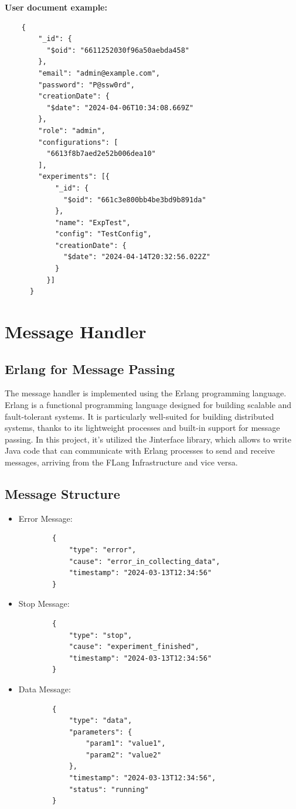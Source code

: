 \textbf{User document example:} \begin{verbatim}
    {
        "_id": {
          "$oid": "6611252030f96a50aebda458"
        },
        "email": "admin@example.com",
        "password": "P@ssw0rd",
        "creationDate": {
          "$date": "2024-04-06T10:34:08.669Z"
        },
        "role": "admin",
        "configurations": [
          "6613f8b7aed2e52b006dea10"
        ],
        "experiments": [{
            "_id": {
              "$oid": "661c3e800bb4be3bd9b891da"
            },
            "name": "ExpTest",
            "config": "TestConfig",
            "creationDate": {
              "$date": "2024-04-14T20:32:56.022Z"
            }
          }]
      }

    \end{verbatim}
\newpage
\section{Message Handler}

\subsection{Erlang for Message Passing}
The message handler is implemented using the Erlang programming language. Erlang is a functional programming language designed for building scalable and fault-tolerant systems. It is particularly well-suited for building distributed systems, thanks to its lightweight processes and built-in support for message passing. In this project, it's utilized the Jinterface library, which allows to write Java code that can communicate with Erlang processes to send and receive messages, arriving from the FLang Infrastructure and vice versa.

\subsection{Message Structure}
\begin{itemize}
    \item Error Message:
          \begin{verbatim}
        {
            "type": "error",
            "cause": "error_in_collecting_data",
            "timestamp": "2024-03-13T12:34:56"
        }
    \end{verbatim}

    \item Stop Message:
          \begin{verbatim}
        {
            "type": "stop",
            "cause": "experiment_finished",
            "timestamp": "2024-03-13T12:34:56"
        }
    \end{verbatim}

    \item Data Message:
          \begin{verbatim}
        {
            "type": "data",
            "parameters": {
                "param1": "value1",
                "param2": "value2"
            },
            "timestamp": "2024-03-13T12:34:56",
            "status": "running"
        }
    \end{verbatim}
\end{itemize}

